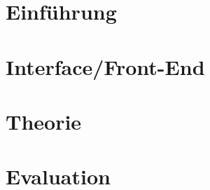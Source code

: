 \documentclass[12pt,ngerman,seminar]{dbvstudentwork}
\begin{document}
	
	\begin{dbvstudentworkTitlepage}
		
		
		
		
		\Deadline{\today}
		
		
	\end{dbvstudentworkTitlepage}
	
	\tableofcontents
	\clearpage
	
	
	\section{Einführung}
	\label{sec:introduction}
		
	
	\section{Interface/Front-End}
	\label{sec:frontend}
		
	\section{Theorie}
	\label{sec:theorie}
		
		
	\section{Evaluation}
	\label{sec:evaluation}
		
		
\end{document}
